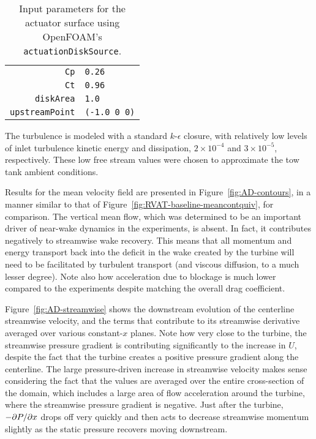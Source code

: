 \begin{table}
    \begin{center}
        \begin{tabular}{r|l}
            \texttt{Cp} & \texttt{0.26} \\
            \texttt{Ct} & \texttt{0.96} \\
            \texttt{diskArea} & \texttt{1.0} \\
            \texttt{upstreamPoint} & \texttt{(-1.0 0 0)} \\
        \end{tabular}
        \caption{Input parameters for the actuator surface using OpenFOAM's
            \texttt{actuationDiskSource}.}
    \label{tab:AS}
    \end{center}
\end{table}

The turbulence is modeled with a standard $k$-$\epsilon$ closure, with
relatively low levels of inlet turbulence kinetic energy and dissipation, $2
\times 10^{-4}$ and $3 \times 10^{-5}$, respectively. These low free stream
values were chosen to approximate the tow tank ambient conditions.

Results for the mean velocity field are presented in
Figure~\ref{fig:AD-contours}, in a manner similar to that of
Figure~\ref{fig:RVAT-baseline-meancontquiv}, for comparison. The vertical mean
flow, which was determined to be an important driver of near-wake dynamics in
the experiments, is absent. In fact, it contributes negatively to streamwise
wake recovery. This means that all momentum and energy transport back into the
deficit in the wake created by the turbine will need to be facilitated by
turbulent transport (and viscous diffusion, to a much lesser degree). Note also
how acceleration due to blockage is much lower compared to the experiments
despite matching the overall drag coefficient.

Figure~\ref{fig:AD-streamwise} shows the downstream evolution of the centerline
streamwise velocity, and the terms that contribute to its streamwise derivative
averaged over various constant-$x$ planes. Note how very close to the turbine,
the streamwise pressure gradient is contributing significantly to the increase
in $U$, despite the fact that the turbine creates a positive pressure gradient
along the centerline. The large pressure-driven increase in streamwise velocity
makes sense considering the fact that the values are averaged over the entire
cross-section of the domain, which includes a large area of flow acceleration
around the turbine, where the streamwise pressure gradient is negative. Just
after the turbine, $-\partial P / \partial x$ drops off very quickly and then acts to
decrease streamwise momentum slightly as the static pressure recovers moving
downstream.

